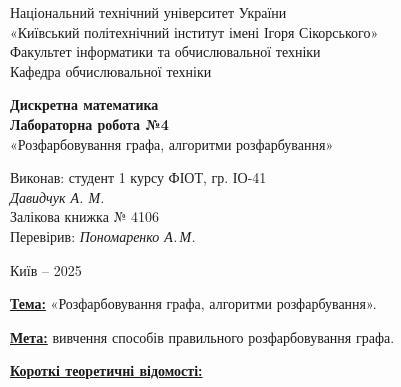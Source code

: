 \documentclass[12pt,a4paper]{article}
\begin{document}
    \begin{titlepage}

        \thispagestyle{empty}
        \begin{center}
        \large
        Національний технічний університет України\\
        «Київський політехнічний інститут імені Ігоря Сікорського»\\[1em]
        Факультет інформатики та обчислювальної техніки\\
        Кафедра обчислювальної техніки
        \end{center}

        \vfill

        \begin{center}
        \textbf{\LARGE Дискретна математика}\\[2em]
        \textbf{\Large Лабораторна робота №4}\\
        «Розфарбовування графа, алгоритми розфарбування» 
        \end{center}

        \vfill

        \begin{flushright}
        Виконав: студент 1 курсу ФІОТ, гр. ІО-41\\
        \textit{Давидчук А. М.}\\
        Залікова книжка № 4106\\[1em]
        Перевірив: \textit{Пономаренко А.\,М.}
        \end{flushright}

        \vfill

        \begin{center}
        Київ -- 2025
        \end{center}

    \end{titlepage}

    \setlength{\parindent}{0pt}

    \textbf{\underline{Тема:}} «Розфарбовування графа, алгоритми розфарбування».

    \vspace{1em}

    \textbf{\underline{Мета:}} вивчення способів правильного розфарбовування графа.

    \vspace{1em}

    \textbf{\underline{Короткі теоретичні відомості:}}
\end{document}
